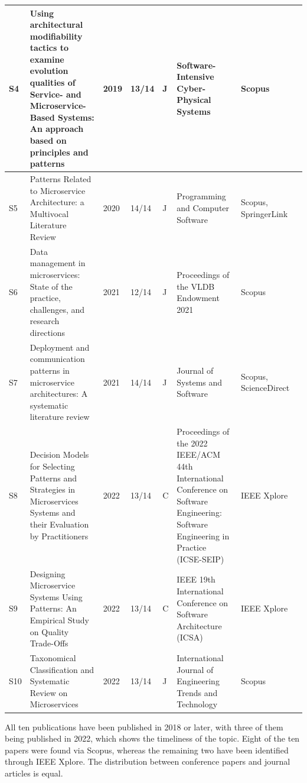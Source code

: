 \documentclass{bmcart}
\begin{document}
\begin{table}[!ht]
\begin{tabular}{|p{0.3cm}|p{4cm}|p{0.7cm}|p{0.8cm}|p{0.5cm}|p{2cm}|p{1cm}|p{0.5cm}|}
      \hline  
      S4 & Using architectural modifiability tactics to examine evolution qualities of Service- and Microservice-Based Systems: An approach based on principles and patterns & 2019 & 13/14 & J & Software-Intensive Cyber-Physical Systems & Scopus & \cite{Bogner.2019} \\ 
      \hline   
      S5 & Patterns Related to Microservice Architecture: a Multivocal Literature Review & 2020 & 14/14 & J & Programming and Computer Software & Scopus, SpringerLink & \cite{Valdivia.2020}  \\ 
      \hline
      S6 & Data management in microservices: State of the practice, challenges, and research directions & 2021 & 12/14 & J & Proceedings of the VLDB Endowment 2021 & Scopus & \cite{Laigner.2021}  \\ 
      \hline
      S7 & Deployment and communication patterns in microservice architectures: A systematic literature review & 2021 & 14/14 & J & Journal of Systems and Software & Scopus, ScienceDirect & \cite{aksakalli2021deployment}  \\ 
      \hline
      S8 & Decision Models for Selecting Patterns and Strategies in Microservices Systems and their Evaluation by Practitioners & 2022 & 13/14 & C & Proceedings of the 2022 IEEE/ACM 44th International Conference on Software Engineering: Software Engineering in Practice (ICSE-SEIP) & IEEE Xplore & \cite{Waseem.2022} \\ 
      \hline
      S9 & Designing Microservice Systems Using Patterns: An Empirical Study on Quality Trade-Offs & 2022 & 13/14 & C & IEEE 19th International Conference on Software Architecture (ICSA) & IEEE Xplore & \cite{Vale.2022} \\ 
      \hline
      S10 & Taxonomical Classification and Systematic Review on Microservices & 2022 & 13/14 & J & International Journal of Engineering Trends and Technology & Scopus & \cite{Weerasinghe.2022}  \\ 
      \hline
  \end{tabular}
  \label{finalLiterature}
\end{table}

All ten publications have been published in 2018 or later, with three of them being published in 2022, which shows the timeliness of the topic. Eight of the ten papers were found via Scopus, whereas the remaining two have been identified through IEEE Xplore. The distribution between conference papers and journal articles is equal.
\end{document}
